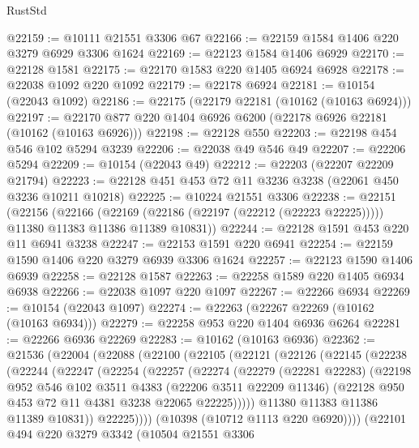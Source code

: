 \begin{lexlean}{RustStd}
\begin{coremodule}
{\begin{coremodule}
{{{{{{{{{{{{{{{{{{{{{{{{{{@22159 := @10111 @21551 @3306 @67
@22166 := @22159 @1584 @1406 @220 @3279 @6929 @3306 @1624
@22169 := @22123 @1584 @1406 @6929
@22170 := @22128 @1581
@22175 := @22170 @1583 @220 @1405 @6924 @6928
@22178 := @22038 @1092 @220 @1092
@22179 := @22178 @6924
@22181 := @10154 (@22043 @1092)
@22186 := @22175 (@22179 @22181 (@10162 (@10163 @6924)))
@22197 := @22170 @877 @220 @1404 @6926 @6200 (@22178 @6926 @22181 (@10162 (@10163 @6926)))
@22198 := @22128 @550
@22203 := @22198 @454 @546 @102 @5294 @3239
@22206 := @22038 @49 @546 @49
@22207 := @22206 @5294
@22209 := @10154 (@22043 @49)
@22212 := @22203 (@22207 @22209 @21794)
@22223 := @22128 @451 @453 @72 @11 @3236 @3238 (@22061 @450 @3236 @10211 @10218)
@22225 := @10224 @21551 @3306
@22238 := @22151
    (@22156
      (@22166
        (@22169 (@22186 (@22197 (@22212 (@22223 @22225)))))
        @11380
        @11383
        @11386
        @11389
        @10831))
@22244 := @22128 @1591 @453 @220 @11 @6941 @3238
@22247 := @22153 @1591 @220 @6941
@22254 := @22159 @1590 @1406 @220 @3279 @6939 @3306 @1624
@22257 := @22123 @1590 @1406 @6939
@22258 := @22128 @1587
@22263 := @22258 @1589 @220 @1405 @6934 @6938
@22266 := @22038 @1097 @220 @1097
@22267 := @22266 @6934
@22269 := @10154 (@22043 @1097)
@22274 := @22263 (@22267 @22269 (@10162 (@10163 @6934)))
@22279 := @22258 @953 @220 @1404 @6936 @6264
@22281 := @22266 @6936 @22269
@22283 := @10162 (@10163 @6936)
@22362 := @21536
    (@22004
      (@22088
        (@22100
          (@22105
            (@22121
              (@22126
                (@22145
                  (@22238
                    (@22244
                      (@22247
                        (@22254
                          (@22257
                            (@22274
                              (@22279
                                (@22281 @22283)
                                (@22198
                                  @952
                                  @546
                                  @102
                                  @3511
                                  @4383
                                  (@22206 @3511 @22209 @11346)
                                  (@22128 @950 @453 @72 @11 @4381 @3238 @22065 @22225)))))
                          @11380
                          @11383
                          @11386
                          @11389
                          @10831))
                      @22225))))
              (@10398 (@10712 @1113 @220 @6920))))
          (@22101
            @494
            @220
            @3279
            @3342
            (@10504
              @21551
              @3306
}}}}}}}}}}}}}}}}}}}}}}}}}}
\end{coremodule}}
\end{coremodule}
\end{lexlean}
